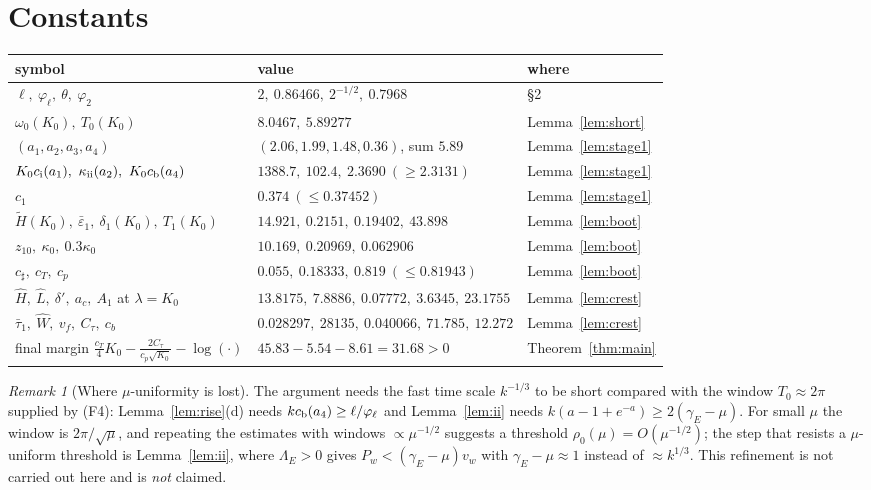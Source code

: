 \documentclass[11pt,a4paper]{article}
\theoremstyle{remark}\newtheorem{remark}[theorem]{Remark}
\begin{document}
\section{Constants}
\begin{center}\small
\begin{tabular}{@{}lll@{}}\toprule
symbol & value & where\\\midrule
$\ell,\ \varphi_\ell,\ \theta,\ \varphi_2$ & $2,\ 0.86466,\ 2^{-1/2},\ 0.7968$ & \S2\\
$\omega_0(K_0),\ T_0(K_0)$ & $8.0467,\ 5.89277$ & Lemma~\ref{lem:short}\\
$(a_1,a_2,a_3,a_4)$ & $(2.06,1.99,1.48,0.36)$, sum $5.89$ & Lemma~\ref{lem:stage1}\\
$K_0c_{\rm i}(a_1),\ \kappa_{\rm ii}(a_2),\ K_0c_{\rm b}(a_4)$ & $1388.7,\ 102.4,\ 2.3690\ (\ge2.3131)$ & Lemma~\ref{lem:stage1}\\
$c_1$ & $0.374\ (\le0.37452)$ & Lemma~\ref{lem:stage1}\\
$\tilde H(K_0),\ \bar\varepsilon_1,\ \delta_1(K_0),\ T_1(K_0)$ & $14.921,\ 0.2151,\ 0.19402,\ 43.898$ & Lemma~\ref{lem:boot}\\
$z_{10},\ \kappa_0,\ 0.3\kappa_0$ & $10.169,\ 0.20969,\ 0.062906$ & Lemma~\ref{lem:boot}\\
$c_\sharp,\ c_T,\ c_p$ & $0.055,\ 0.18333,\ 0.819\ (\le0.81943)$ & Lemma~\ref{lem:boot}\\
$\hat H,\ \hat L,\ \delta',\ a_c,\ A_1$ at $\lambda=K_0$ & $13.8175,\ 7.8886,\ 0.07772,\ 3.6345,\ 23.1755$ & Lemma~\ref{lem:crest}\\
$\bar\tau_1,\ \hat W,\ v_f,\ C_\tau,\ c_b$ & $0.028297,\ 28135,\ 0.040066,\ 71.785,\ 12.272$ & Lemma~\ref{lem:crest}\\
final margin $\tfrac{c_T}{4}K_0-\tfrac{2C_\tau}{c_p\sqrt{K_0}}-\log(\cdot)$ & $45.83-5.54-8.61=31.68>0$ & Theorem~\ref{thm:main}\\\bottomrule
\end{tabular}\end{center}

\begin{remark}[Where $\mu$-uniformity is lost]\label{rem:mu}
The argument needs the fast time scale $k^{-1/3}$ to be short compared with the window
$T_0\approx2\pi$ supplied by (F4): Lemma~\ref{lem:rise}(d) needs $kc_{\rm b}(a_4)\ge\ell/\varphi_\ell$ and
Lemma~\ref{lem:ii} needs $k(a-1+e^{-a})\ge2(\gamma_E-\mu)$. For small $\mu$ the window is
$2\pi/\sqrt\mu$, and repeating the estimates with windows $\propto\mu^{-1/2}$ suggests a threshold
$\rho_0(\mu)=O(\mu^{-1/2})$; the step that resists a $\mu$-uniform threshold is Lemma~\ref{lem:ii}, where
$\Lambda_E>0$ gives $P_w<(\gamma_E-\mu)v_w$ with $\gamma_E-\mu\approx1$ instead of $\approx k^{1/3}$.
This refinement is not carried out here and is \emph{not} claimed.
\end{remark}
\end{document}
